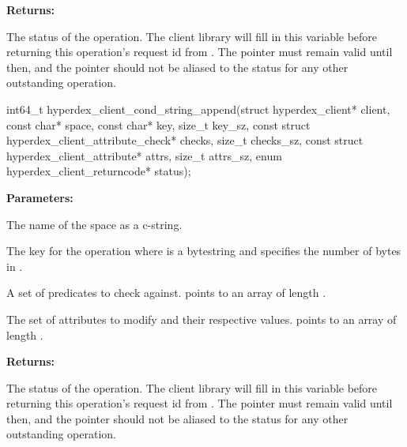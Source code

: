 \noindent\textbf{Returns:}
\begin{description}[labelindent=\widthof{{\code{status}}},leftmargin=*,noitemsep,nolistsep,align=right]
\item[\code{status}] The status of the operation.  The client library will fill in this variable before returning this operation's request id from .  The pointer must remain valid until then, and the pointer should not be aliased to the status for any other outstanding operation.
\end{description}

\funcsep
{}
\begin{ccode}
int64_t hyperdex_client_cond_string_append(struct hyperdex_client* client,
                const char* space,
                const char* key, size_t key_sz,
                const struct hyperdex_client_attribute_check* checks, size_t checks_sz,
                const struct hyperdex_client_attribute* attrs, size_t attrs_sz,
                enum hyperdex_client_returncode* status);
\end{ccode}
\funcdesc 

\noindent\textbf{Parameters:}
\begin{description}[labelindent=\widthof{{\code{checks}, \code{checks\_sz}}},leftmargin=*,noitemsep,nolistsep,align=right]
\item[\code{space}] The name of the space as a c-string.
\item[\code{key}, \code{key\_sz}] The key for the operation where  is a bytestring and  specifies the number of bytes in .
\item[\code{checks}, \code{checks\_sz}] A set of predicates to check against.   points to an array of length .
\item[\code{attrs}, \code{attrs\_sz}] The set of attributes to modify and their respective values.   points to an array of length .
\end{description}

\noindent\textbf{Returns:}
\begin{description}[labelindent=\widthof{{\code{status}}},leftmargin=*,noitemsep,nolistsep,align=right]
\item[\code{status}] The status of the operation.  The client library will fill in this variable before returning this operation's request id from .  The pointer must remain valid until then, and the pointer should not be aliased to the status for any other outstanding operation.
\end{description}

